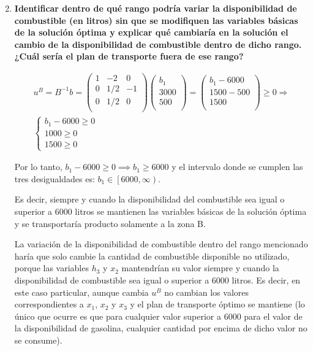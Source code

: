 \begin{enumerate}
    \setcounter{enumi}{1} %

    \item \textbf{Identificar dentro de qué rango podría variar la disponibilidad de combustible (en litros) sin que se modifiquen las variables básicas de la solución óptima y explicar qué cambiaría en la solución el cambio de la disponibilidad de combustible dentro de dicho rango. ¿Cuál sería el plan de transporte fuera de ese rango?}

    \begin{equation}
    \begin{split}
    u^B=B^{-1}b = \begin{pmatrix}
    1 & -2 & 0\\
    0 & 1/2 & -1\\
    0 & 1/2 & 0\\
    \end{pmatrix}
    \begin{pmatrix}
    b_1\\
    3000\\
    500\\
    \end{pmatrix}
     = \begin{pmatrix}
    b_1-6000\\
    1500 - 500\\
    1500\\
    \end{pmatrix}
    \geq 0 \Rightarrow \\
    \left\{
    \begin{array}{l}
    b_1 - 6000 \geq 0 \\
    1000 \geq 0 \\
    1500 \geq 0
    \end{array}
    \right.
    \end{split}
    \end{equation}

    Por lo tanto, $b_1 - 6000 \geq 0 \implies b_1 \geq 6000$ y el intervalo donde se cumplen las tres desigualdades es: $b_1 \in \left[6000, \infty \right)$.
    
    Es decir, siempre y cuando la disponibilidad del combustible sea igual o superior a 6000 litros se mantienen las variables básicas de la solución óptima y se transportaría producto solamente a la zona B.
    
    La variación de la disponibilidad de combustible dentro del rango mencionado haría que solo cambie la cantidad de combustible disponible no utilizado, porque las variables $h_3$ y $x_2$ mantendrían su valor siempre y cuando la disponibilidad de combustible sea igual o superior a 6000 litros. Es decir, en este caso particular, aunque cambia $u^B$ no cambian los valores correspondientes a $x_1$, $x_2$ y $x_3$ y el plan de transporte óptimo se mantiene (lo único que ocurre es que para cualquier valor superior a 6000 para el valor de la disponibilidad de gasolina, cualquier cantidad por encima de dicho valor no se consume).


\end{enumerate}
